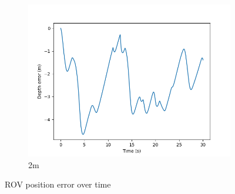 \documentclass[class=article, crop=false]{standalone}
\begin{document}
\begin{figure}
\begin{subfigure}[b]{0.48\textwidth}
        \includegraphics{scenario1/rov-100m/2.0m/rov_depth_error_controlled}
        \caption{2m}
        \label{}
    \end{subfigure}

    \caption{ROV position error over time}
\end{figure}
\end{document}
